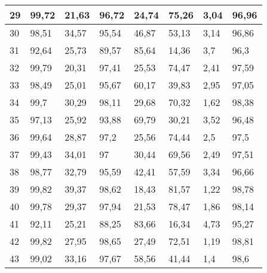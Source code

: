 \begin{longtable}[c]{|l|l|l|l|l|l|l|l|}
29              & 99,72        & 21,63        & 96,72       & 24,74         & 75,26         & 3,04          & 96,96         \\ \hline
30              & 98,51        & 34,57        & 95,54       & 46,87         & 53,13         & 3,14          & 96,86         \\ \hline
31              & 92,64        & 25,73        & 89,57       & 85,64         & 14,36         & 3,7           & 96,3          \\ \hline
32              & 99,79        & 20,31        & 97,41       & 25,53         & 74,47         & 2,41          & 97,59         \\ \hline
33              & 98,49        & 25,01        & 95,67       & 60,17         & 39,83         & 2,95          & 97,05         \\ \hline
34              & 99,7         & 30,29        & 98,11       & 29,68         & 70,32         & 1,62          & 98,38         \\ \hline
35              & 97,13        & 25,92        & 93,88       & 69,79         & 30,21         & 3,52          & 96,48         \\ \hline
36              & 99,64        & 28,87        & 97,2        & 25,56         & 74,44         & 2,5           & 97,5          \\ \hline
37              & 99,43        & 34,01        & 97          & 30,44         & 69,56         & 2,49          & 97,51         \\ \hline
38              & 98,77        & 32,79        & 95,59       & 42,41         & 57,59         & 3,34          & 96,66         \\ \hline
39              & 99,82        & 39,37        & 98,62       & 18,43         & 81,57         & 1,22          & 98,78         \\ \hline
40              & 99,78        & 29,37        & 97,94       & 21,53         & 78,47         & 1,86          & 98,14         \\ \hline
41              & 92,11        & 25,21        & 88,25       & 83,66         & 16,34         & 4,73          & 95,27         \\ \hline
42              & 99,82        & 27,95        & 98,65       & 27,49         & 72,51         & 1,19          & 98,81         \\ \hline
43              & 99,02        & 33,16        & 97,67       & 58,56         & 41,44         & 1,4           & 98,6          \\ \hline

\end{longtable}
